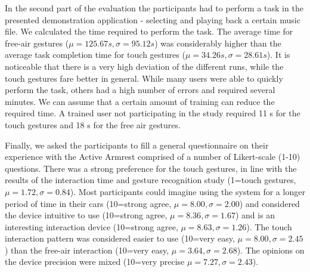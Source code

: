 In the second part of the evaluation the participants had to perform a task in the presented demonstration application - selecting and playing back a certain music file. We calculated the time required to perform the task. The average time for free-air gestures ($\mu=125.67s, \sigma=95.12s$) was considerably higher than the average task completion time for touch gestures ($\mu=34.26s, \sigma=28.61s$). It is noticeable that there is a very high deviation of the different runs, while the touch gestures fare better in general. While many users were able to quickly perform the task, others had a high number of errors and required several minutes. We can assume that a certain amount of training can reduce the required time. A trained user not participating in the study required 11 s for the touch gestures and 18 s for the free air gestures.

Finally, we asked the participants to fill a general questionnaire on their experience with the Active Armrest comprised of a number of Likert-scale (1-10) questions. There was a strong preference for the touch gestures, in line with the results of the interaction time and gesture recognition study (1=touch gestures, $\mu=1.72, \sigma=0.84$). Most participants could imagine using the system for a longer period of time in their cars (10=strong agree, $\mu=8.00, \sigma=2.00$) and considered the device intuitive to use (10=strong agree, $\mu=8.36, \sigma=1.67$) and is an interesting interaction device (10=strong agree, $\mu=8.63, \sigma=1.26$). The touch interaction pattern was considered easier to use (10=very easy, $\mu=8.00, \sigma=2.45$) than the free-air interaction (10=very easy, $\mu=3.64, \sigma=2.68$). The opinions on the device precision were mixed (10=very precise $\mu=7.27, \sigma=2.43$).

